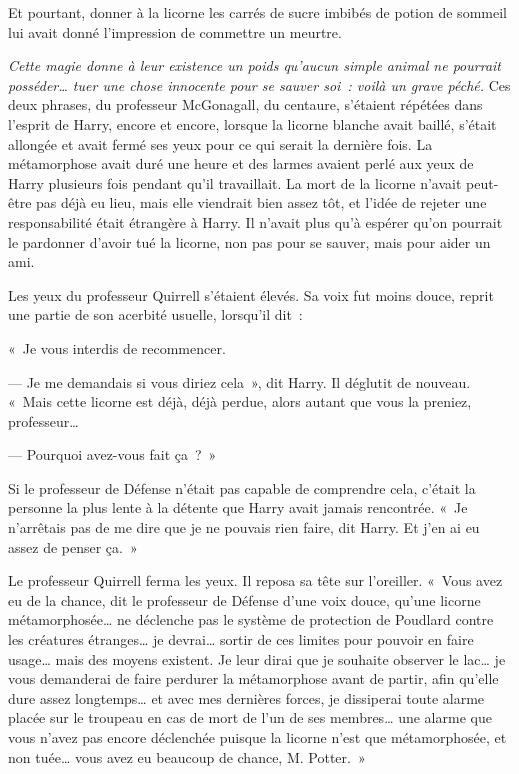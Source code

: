 Et pourtant, donner à la licorne les carrés de sucre imbibés de potion de sommeil lui avait donné l'impression de commettre un meurtre.

\emph{Cette magie donne à leur existence un poids qu'aucun simple animal ne pourrait posséder… tuer une chose innocente pour se sauver soi~: voilà un grave péché.} Ces deux phrases, du professeur McGonagall, du centaure, s'étaient répétées dans l'esprit de Harry, encore et encore, lorsque la licorne blanche avait baillé, s'était allongée et avait fermé ses yeux pour ce qui serait la dernière fois.
La métamorphose avait duré une heure et des larmes avaient perlé aux yeux de Harry plusieurs fois pendant qu'il travaillait.
La mort de la licorne n'avait peut-être pas déjà eu lieu, mais elle viendrait bien assez tôt, et l'idée de rejeter une responsabilité était étrangère à Harry.
Il n'avait plus qu'à espérer qu'on pourrait le pardonner d'avoir tué la licorne, non pas pour se sauver, mais pour aider un ami.

Les yeux du professeur Quirrell s'étaient élevés.
Sa voix fut moins douce, reprit une partie de son acerbité usuelle, lorsqu'il dit~:

«~Je vous interdis de recommencer.

--- Je me demandais si vous diriez cela~», dit Harry.
Il déglutit de nouveau.
«~Mais cette licorne est déjà, déjà perdue, alors autant que vous la preniez, professeur…

--- Pourquoi avez-vous fait ça~?~»

Si le professeur de Défense n'était pas capable de comprendre cela, c'était la personne la plus lente à la détente que Harry avait jamais rencontrée.
«~Je n'arrêtais pas de me dire que je ne pouvais rien faire, dit Harry.
Et j'en ai eu assez de penser ça.~»

Le professeur Quirrell ferma les yeux.
Il reposa sa tête sur l'oreiller.
«~Vous avez eu de la chance, dit le professeur de Défense d'une voix douce, qu'une licorne métamorphosée… ne déclenche pas le système de protection de Poudlard contre les créatures étranges… je devrai… sortir de ces limites pour pouvoir en faire usage… mais des moyens existent.
Je leur dirai que je souhaite observer le lac… je vous demanderai de faire perdurer la métamorphose avant de partir, afin qu'elle dure assez longtemps… et avec mes dernières forces, je dissiperai toute alarme placée sur le troupeau en cas de mort de l'un de ses membres… une alarme que vous n'avez pas encore déclenchée puisque la licorne n'est que métamorphosée, et non tuée… vous avez eu beaucoup de chance, M. Potter.~»

